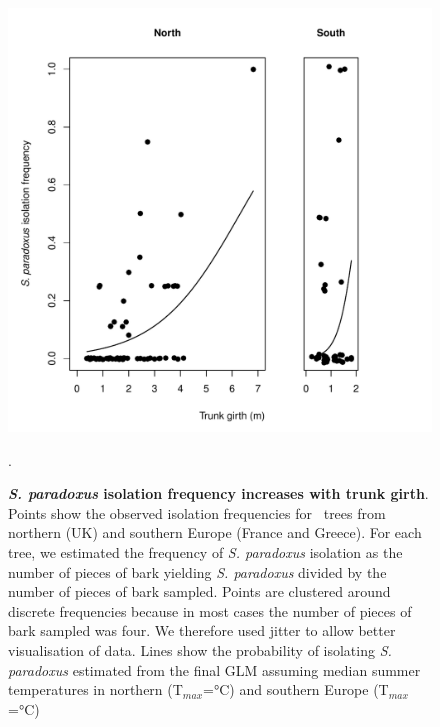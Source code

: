 \documentclass[12pt]{article}
\begin{document}
\begin{figure}[h!] \centering 
\includegraphics[width=1.0\textwidth]{../figs_tables/Figure2Circum.pdf} 
\caption{{\bf \textit{S. paradoxus} isolation frequency increases with trunk girth}. Points show the observed isolation frequencies for \circumtreecount\ trees from northern (UK) and southern Europe (France and Greece). For each tree, we estimated the frequency of \textit{S. paradoxus} isolation as the number of pieces of bark yielding \textit{S. paradoxus} divided by the number of pieces of bark sampled. Points are clustered around discrete frequencies because in most cases the number of pieces of bark sampled was four. We therefore used jitter to allow better visualisation of data. Lines show the probability of isolating \textit{S. paradoxus} estimated from the final GLM assuming median summer temperatures in northern (T$_{max}$=\mediannorthtemp\si{\degreeCelsius}) and southern Europe (T$_{max}$=\mediansouthtemp\si{\degreeCelsius})}. 
\label{fig:circum_figure} 
\end{figure}
\clearpage
\end{document}
